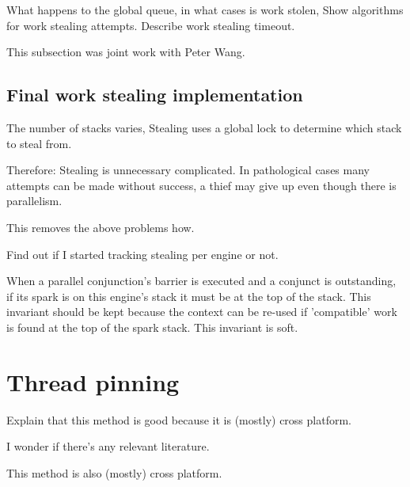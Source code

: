 What happens to the global queue,
in what cases is work stolen,
Show algorithms for work stealing attempts.
Describe work stealing timeout.


This subsection was joint work with Peter Wang.

\subsection{Final work stealing implementation}

The number of stacks varies,
Stealing uses a global lock to determine which stack to steal from.

Therefore:
Stealing is unnecessary complicated.
In pathological cases many attempts can be made without success,
a thief may give up even though there is parallelism.

This removes the above problems how.

Find out if I started tracking stealing per engine or not.

When a parallel conjunction's barrier is executed and a conjunct is
outstanding, if its spark is on this engine's stack it must be at the top of
the stack.
This invariant should be kept because the context can be re-used if
'compatible' work is found at the top of the spark stack.
This invariant is soft.


\section{Thread pinning}
\label{sec:thread_pinning}


Explain that this method is good because it is (mostly) cross platform.

I wonder if there's any relevant literature.

This method is also (mostly) cross platform.

